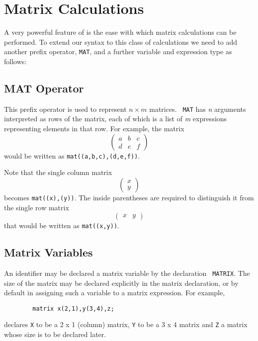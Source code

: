 \chapter{Matrix Calculations} 
A very powerful feature of {\REDUCE} is the ease with which matrix
calculations can be performed. To extend our syntax to this class of
calculations we need to add another prefix operator, {\tt MAT},
 and a further
variable and expression type as follows:

\section{MAT Operator}
\hypertarget{operator:MAT}{}
This prefix operator is used to represent $n\times m$ matrices. {\tt
MAT} has {\em n} arguments interpreted as rows of the matrix, each of
which is a list of {\em m} expressions representing elements in that row.
For example, the matrix
\[ \left( \begin{array}{lcr} a & b & c \\ d & e & f \end{array} \right) \]
would be written as {\tt mat((a,b,c),(d,e,f))}.

Note that the single column matrix
\[ \left( \begin{array}{c} x \\ y \end{array} \right) \]
becomes {\tt mat((x),(y))}.  The inside parentheses are required to
distinguish it from the single row matrix
\[ \left( \begin{array}{lr} x & y \end{array} \right) \]
that would be written as {\tt mat((x,y))}.

\section{Matrix Variables}
\hypertarget{command:MATRIX}{}

An identifier may be declared a matrix variable by the declaration {\tt
MATRIX}.
The size of the matrix may be declared explicitly in the matrix
declaration, or by default in assigning such a variable to a matrix
expression. For example,
\begin{verbatim}
        matrix x(2,1),y(3,4),z;
\end{verbatim}
declares {\tt X} to be a 2 x 1 (column) matrix, {\tt Y} to be a 3 x 4
matrix and {\tt Z} a matrix whose size is to be declared later.

